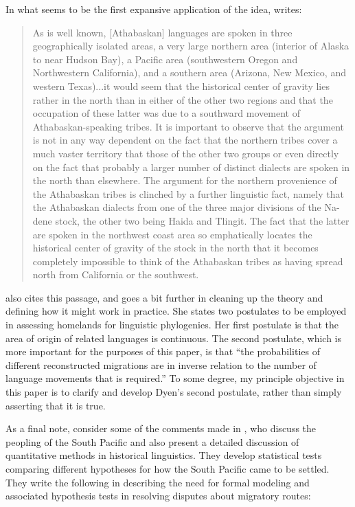 \documentclass[11pt]{article}
\begin{document}
In what seems to be the first expansive  application of the idea, \cite{sapir16} writes:

\begin{quote}
 As is well known, [Athabaskan] languages are spoken in three geographically isolated areas, a very large northern area (interior of Alaska to near Hudson Bay), a Pacific area (southwestern Oregon and Northwestern California), and a southern area (Arizona, New Mexico, and western Texas)...it would seem that the historical center of gravity lies rather in the north than in either of the other two regions and that the occupation of these latter was due to a southward movement of Athabaskan-speaking tribes. It is important to observe that the argument is not in any way dependent on the fact that the northern tribes cover a much vaster territory that those of the other two groups or even directly on the fact that probably a larger number of distinct dialects are spoken in the north than elsewhere. The argument for the northern provenience of the Athabaskan tribes is clinched by a further linguistic fact, namely that the Athabaskan dialects from one of the three major divisions of the Na-dene stock, the other two being Haida and Tlingit. The fact that the latter are spoken in the northwest coast area so emphatically locates the historical center of gravity of the stock in the north that it becomes completely impossible to think of the Athabaskan tribes as having spread north from California or the southwest. 
\end{quote}


\citet[p. 623]{dyen56} also cites this passage, and goes a bit further in cleaning up the theory and defining how it might work  in practice. She states two postulates to be employed in assessing homelands for linguistic phylogenies. Her first postulate is that the area of origin of related languages is continuous. The second postulate, which is more important for the purposes of this paper, is that ``the probabilities of different reconstructed migrations are in inverse relation to the number of language movements that is required.'' \citep[p.613]{dyen56} 
To some degree, my principle objective in this paper is to clarify and develop Dyen's second postulate, rather than simply asserting that it is true.

As a final note, consider some of the comments made in \cite{greenhill05}, who discuss the peopling of the South Pacific and also present a detailed discussion of quantitative methods in historical linguistics. They develop statistical tests comparing different hypotheses for how the South Pacific came to be settled. They write the following in describing the need for formal modeling and associated hypothesis tests in resolving disputes about migratory routes:
\end{document}
